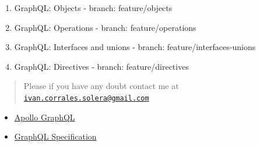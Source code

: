 \documentclass[]{book}
\providecommand{\tightlist}{%
  \setlength{\itemsep}{0pt}\setlength{\parskip}{0pt}}
\begin{document}
\begin{enumerate}
\def\labelenumi{\arabic{enumi}.}
\setcounter{enumi}{3}
\tightlist
\item
  GraphQL: Objects - branch: feature/objects
\item
  GraphQL: Operations - branch: feature/operations
\item
  GraphQL: Interfaces and unions - branch: feature/interfaces-unions
\item
  GraphQL: Directives - branch: feature/directives
\end{enumerate}

\begin{quote}
Please if you have any doubt contact me at
\href{mailto:ivan.corrales.solera@gmail.com}{\nolinkurl{ivan.corrales.solera@gmail.com}}
\end{quote}

\begin{itemize}
\tightlist
\item
  \href{https://www.apollographql.com/docs/}{Apollo GraphQL}
\item
  \href{https://facebook.github.io/graphql/}{GraphQL Specification}
\end{itemize}
\end{document}
